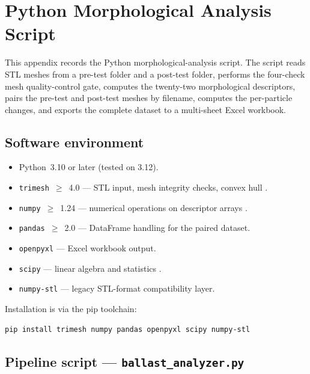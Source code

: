 \chapter[Python Morphology Script]{Python Morphological Analysis Script}
\label{chap:appB}

This appendix records the Python morphological-analysis script. The script
reads STL meshes from a pre-test folder and a post-test folder, performs
the four-check mesh quality-control gate, computes the twenty-two
morphological descriptors, pairs the pre-test and post-test meshes by
filename, computes the per-particle changes, and exports the complete
dataset to a multi-sheet Excel workbook.

\section{Software environment}
\label{sec:appB-env}

\begin{itemize}[leftmargin=*,itemsep=2pt]
    \item Python~\num{3.10} or later (tested on 3.12).
    \item \texttt{trimesh}~$\ge$~\num{4.0} --- \gls{STL} input, mesh integrity
          checks, convex hull \citep{DawsonHaggerty2019}.
    \item \texttt{numpy}~$\ge$~\num{1.24} --- numerical operations on
          descriptor arrays \citep{Harris2020}.
    \item \texttt{pandas}~$\ge$~\num{2.0} --- DataFrame handling for the
          paired dataset.
    \item \texttt{openpyxl} --- Excel workbook output.
    \item \texttt{scipy} --- linear algebra and statistics
          \citep{Virtanen2020}.
    \item \texttt{numpy-stl} --- legacy STL-format compatibility layer.
\end{itemize}

Installation is via the pip toolchain:
\begin{lstlisting}[language=bash]
pip install trimesh numpy pandas openpyxl scipy numpy-stl
\end{lstlisting}

\section{Pipeline script --- \texttt{ballast\_analyzer.py}}
\label{sec:appB-script}

